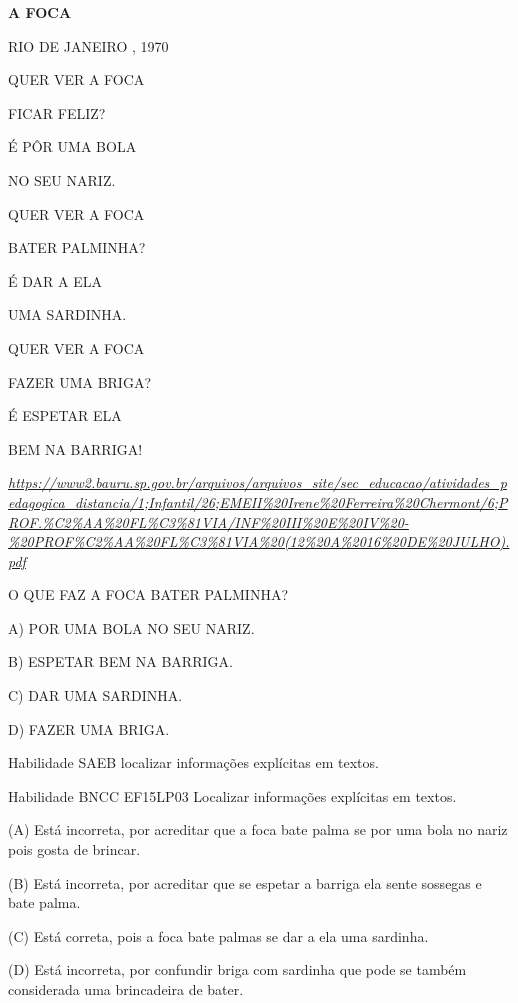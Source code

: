 \textbf{A FOCA}

RIO DE JANEIRO , 1970

QUER VER A FOCA

FICAR FELIZ?

É PÔR UMA BOLA

NO SEU NARIZ.

QUER VER A FOCA

BATER PALMINHA?

É DAR A ELA

UMA SARDINHA.

QUER VER A FOCA

FAZER UMA BRIGA?

É ESPETAR ELA

BEM NA BARRIGA!

\href{https://www2.bauru.sp.gov.br/arquivos/arquivos_site/sec_educacao/atividades_pedagogica_distancia/1;Infantil/26;EMEII\%20Irene\%20Ferreira\%20Chermont/6;PROF.\%C2\%AA\%20FL\%C3\%81VIA/INF\%20III\%20E\%20IV\%20-\%20PROF\%C2\%AA\%20FL\%C3\%81VIA\%20(12\%20A\%2016\%20DE\%20JULHO).pdf}{\emph{https://www2.bauru.sp.gov.br/arquivos/arquivos\_site/sec\_educacao/atividades\_pedagogica\_distancia/1;Infantil/26;EMEII\%20Irene\%20Ferreira\%20Chermont/6;PROF.\%C2\%AA\%20FL\%C3\%81VIA/INF\%20III\%20E\%20IV\%20-\%20PROF\%C2\%AA\%20FL\%C3\%81VIA\%20(12\%20A\%2016\%20DE\%20JULHO).pdf}}

O QUE FAZ A FOCA BATER PALMINHA?

A) POR UMA BOLA NO SEU NARIZ.

B) ESPETAR BEM NA BARRIGA.

C) DAR UMA SARDINHA.

D) FAZER UMA BRIGA.

\protect\hypertarget{_heading=h.3j2qqm3}{}{}Habilidade SAEB localizar
informações explícitas em textos.

Habilidade BNCC EF15LP03 Localizar informações explícitas em textos.

(A) Está incorreta, por acreditar que a foca bate palma se por uma bola
no nariz pois gosta de brincar.

(B) Está incorreta, por acreditar que se espetar a barriga ela sente
sossegas e bate palma.

(C) Está correta, pois a foca bate palmas se dar a ela uma sardinha.

(D) Está incorreta, por confundir briga com sardinha que pode se também
considerada uma brincadeira de bater.

\section{\texorpdfstring{\\
}{ }}\label{section-11}

